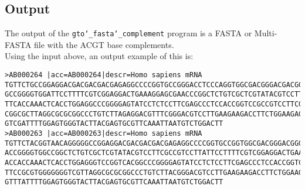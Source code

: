 \subsection*{Output}
The output of the \texttt{gto\char`_fasta\char`_complement} program is a FASTA or Multi-FASTA file with the ACGT base complements.\\
Using the input above, an output example of this is:
\begin{lstlisting}
>AB000264 |acc=AB000264|descr=Homo sapiens mRNA 
TGTTCTGCCGGAGGACGACGACGACGAGAGGCCCCGGTGCCGGGACCTCCCAGGTGGCGACGGGACGACGGTAACAGGG
GCCGGGGTGGATTCCTTTTCGTCGGAGGACTGAAAGGAGCGAACCCGGCTCTGTCGCTCGTATACGTCCTTCGCCGTCC
TTCACCAAACTCACCTGGAGGCCCGGGGAGTATCCTCTCCTTCGAGCCCTCCACCGGTCCGCCGTCCTTCGTCCGGTCA
CGGCGCTTAGGCGCGCGGCCCTGTCTTAGAGGACGTTTCGGGACGTCCTTGAAGAAGACCTTCTGGAAGAGGTGGGGGG
GTCGATTTTGGAGTGGGTACTTACGAGTGCGTTCAAATTAATGTCTGGACTT
>AB000263 |acc=AB000263|descr=Homo sapiens mRNA 
TGTTCTACGGTAACAGGGGGCCGGAGGACGACGACGACGAGAGGCCCCGGTGCCGGTGGCGACGGGACGGGGACCTCCC
ACCGGGGTGGCCGGCTCTGTCGCTCGTATACGTCCTTCGCCGTCCTTATTCCTTTTCGTCGGAGGACTGAAAGGAGCGA
ACCACCAAACTCACCTGGAGGGTCCGGTCACGGCCCGGGGAGTATCCTCTCCTTCGAGCCCTCCACCGGTCCGCCGTCC
TTCCGCGTGGGGGGGTCGTTAGGCGCGCGGCCCTGTCTTACGGGACGTCCTTGAAGAAGACCTTCTGGAAGAGGAGGAC
GTTTATTTTGGAGTGGGTACTTACGAGTGCGTTCAAATTAATGTCTGGACTT
\end{lstlisting}